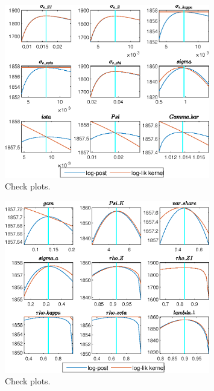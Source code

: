  
\begin{figure}[H]
\centering 
\includegraphics[width=0.80\textwidth]{directed_search_est_alt_obs/graphs/directed_search_est_alt_obs_CheckPlots1}
\caption{Check plots.}\label{Fig:CheckPlots:1}
\end{figure}
 
\begin{figure}[H]
\centering 
\includegraphics[width=0.80\textwidth]{directed_search_est_alt_obs/graphs/directed_search_est_alt_obs_CheckPlots2}
\caption{Check plots.}\label{Fig:CheckPlots:2}
\end{figure}
 
